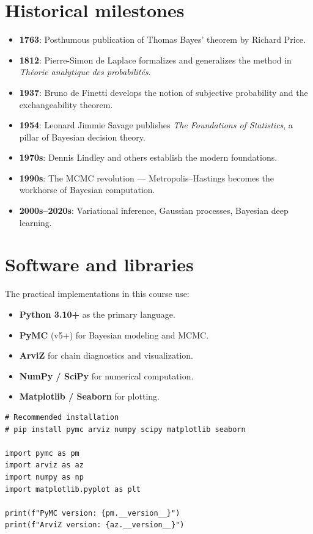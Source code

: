 \section*{Historical milestones}

\begin{itemize}
  \item \textbf{1763}: Posthumous publication of Thomas Bayes' theorem
        by Richard Price.
  \item \textbf{1812}: Pierre-Simon de Laplace formalizes and generalizes
        the method in \textit{Th\'eorie analytique des probabilit\'es}.
  \item \textbf{1937}: Bruno de Finetti develops the notion of subjective
        probability and the exchangeability theorem.
  \item \textbf{1954}: Leonard Jimmie Savage publishes \textit{The
        Foundations of Statistics}, a pillar of Bayesian decision theory.
  \item \textbf{1970s}: Dennis Lindley and others establish the modern
        foundations.
  \item \textbf{1990s}: The MCMC revolution --- Metropolis--Hastings
        becomes the workhorse of Bayesian computation.
  \item \textbf{2000s--2020s}: Variational inference, Gaussian processes,
        Bayesian deep learning.
\end{itemize}

\section*{Software and libraries}

The practical implementations in this course use:

\begin{itemize}
  \item \textbf{Python 3.10+} as the primary language.
  \item \textbf{PyMC} (v5+) for Bayesian modeling and MCMC.
  \item \textbf{ArviZ} for chain diagnostics and visualization.
  \item \textbf{NumPy / SciPy} for numerical computation.
  \item \textbf{Matplotlib / Seaborn} for plotting.
\end{itemize}

\begin{codeblock}[title=\textbf{Installing dependencies}]
\begin{verbatim}
# Recommended installation
# pip install pymc arviz numpy scipy matplotlib seaborn

import pymc as pm
import arviz as az
import numpy as np
import matplotlib.pyplot as plt

print(f"PyMC version: {pm.__version__}")
print(f"ArviZ version: {az.__version__}")
\end{verbatim}
\end{codeblock}

